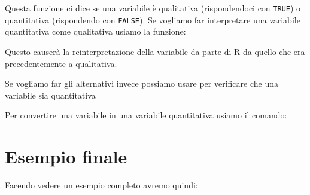 

Questa funzione ci dice se una variabile è qualitativa (rispondendoci con
\texttt{TRUE}) o quantitativa (rispondendo con \texttt{FALSE}). Se vogliamo far
interpretare una variabile quantitativa come qualitativa usiamo la funzione:



Questo causerà la reinterpretazione della variabile da parte di R da quello che
era precedentemente a qualitativa.

Se vogliamo far gli alternativi invece possiamo usare per verificare che una
variabile sia quantitativa



Per convertire una variabile in una variabile quantitativa usiamo il comando:



\section{Esempio finale}

Facendo vedere un esempio completo avremo quindi:


